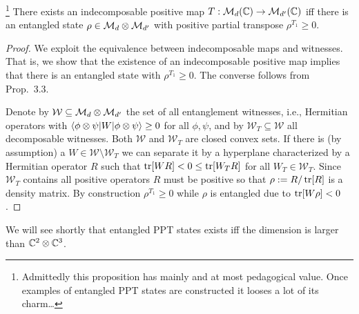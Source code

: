 \documentclass[11pt,a4paper]{article}
\numberwithin{equation}{section}
\begin{document}
\begin{proposition}\label{prop:ch3-ppt-entangled}
    \footnote{Admittedly this proposition has mainly and at most pedagogical value. Once examples of entangled PPT states
        are constructed it looses a lot of its charm\ldots}
    There exists an indecomposable positive map $T:\mathcal{M}_d(\mathbb{C})\to \mathcal{M}_{d'}(\mathbb{C})$ iff there is an entangled state
    $\rho\in \mathcal{M}_d\otimes \mathcal{M}_{d'}$ with positive partial transpose $\rho^{T_1}\ge 0$.
\end{proposition}

\begin{proof}
    We exploit the equivalence between indecomposable maps and witnesses. That is, we show that the existence of an
    indecomposable positive map implies that there is an entangled state with $\rho^{T_1}\ge 0$. The converse follows from
    Prop.~3.3.

    Denote by $\mathcal W\subseteq \mathcal{M}_d\otimes \mathcal{M}_{d'}$ the set of all entanglement witnesses, i.e., Hermitian
    operators with $\langle\phi\otimes \psi|W|\phi\otimes \psi\rangle\ge 0$ for all $\phi,\psi$, and by
    $\mathcal W_T\subseteq \mathcal W$ all decomposable witnesses. Both $\mathcal W$ and $\mathcal W_T$ are closed convex
    sets. If there is (by assumption) a $W\in \mathcal W\setminus \mathcal W_T$ we can separate it by a hyperplane
    characterized by a Hermitian operator $R$ such that $\operatorname{tr}[WR]<0\le \operatorname{tr}[W_T R]$ for all $W_T\in \mathcal W_T$. Since
    $\mathcal W_T$ contains all positive operators $R$ must be positive so that $\rho:=R/\operatorname{tr}[R]$ is a density matrix. By
    construction $\rho^{T_1}\ge 0$ while $\rho$ is entangled due to $\operatorname{tr}[W\rho]<0$.
\end{proof}

We will see shortly that entangled PPT states exists iff the dimension is larger than $\mathbb{C}^2\otimes \mathbb{C}^3$.
\end{document}
